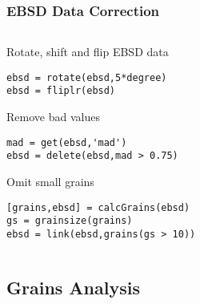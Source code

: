 \documentclass[compress]{beamer}
\begin{document}
\begin{frame}[fragile]
 \frametitle{EBSD Data Correction}

  \begin{columns}
   \begin{column}{8cm}
	Rotate, shift and flip EBSD data
\begin{lstlisting}
ebsd = rotate(ebsd,5*degree)
ebsd = fliplr(ebsd)
\end{lstlisting}

        \pause
	\medskip

        Remove bad values
\begin{lstlisting}
mad = get(ebsd,'mad')
ebsd = delete(ebsd,mad > 0.75)
\end{lstlisting}

        \pause
	\medskip

       Omit small grains
\begin{lstlisting}
[grains,ebsd] = calcGrains(ebsd)
gs = grainsize(grains)
ebsd = link(ebsd,grains(gs > 10))
\end{lstlisting}

   \end{column}

    \begin{column}{4cm}

    \end{column}

 \end{columns}

\end{frame}

\subsection*{Grains Analysis}
\end{document}
